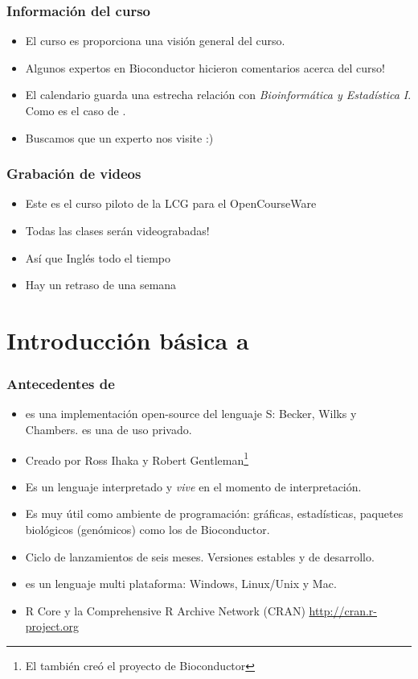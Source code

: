 \begin{frame}[allowframebreaks]
  \frametitle{Informaci\'on del curso}
  \begin{itemize}
  \item El curso es proporciona una visi\'on general del curso.
  \item Algunos expertos en Bioconductor hicieron comentarios acerca del curso!
  \item El calendario guarda una estrecha relaci\'on con \emph{Bioinform\'atica y Estad\'istica I}. Como es el caso de .
  \item Buscamos que un experto nos visite :)
  \end{itemize}
\end{frame}


\begin{frame}[allowframebreaks]
  \frametitle{Grabaci\'on de videos}
  \begin{itemize}
  \item Este es el curso piloto de la LCG para el OpenCourseWare
  \item Todas las clases ser\'an videograbadas!
  \item As\'i que \alert{Ingl\'es} todo el tiempo
  \item Hay un retraso de una semana
  \end{itemize}
\end{frame}

\section{Introducci\'on b\'asica a  }

\begin{frame}[allowframebreaks]
  \frametitle{Antecedentes de }
  \begin{itemize}
  \item {} es una implementaci\'on open-source del lenguaje S: Becker, Wilks y Chambers.  es una de uso privado.
  \item Creado por Ross Ihaka y Robert Gentleman\footnote{El tambi\'en cre\'o el proyecto de Bioconductor}
  \item Es un lenguaje interpretado y \alert{\emph{vive}} en el momento de interpretaci\'on.
  \item Es muy \'util como ambiente de programaci\'on: gr\'aficas, estad\'isticas, paquetes biol\'ogicos (gen\'omicos) como los de Bioconductor.
  \item Ciclo de lanzamientos de seis meses. Versiones estables y de desarrollo. 
  \item {} es un lenguaje multi plataforma: Windows, Linux/Unix y Mac.
  \item R Core y la Comprehensive R Archive Network (CRAN) \url{http://cran.r-project.org}
  \end{itemize}
\end{frame}


